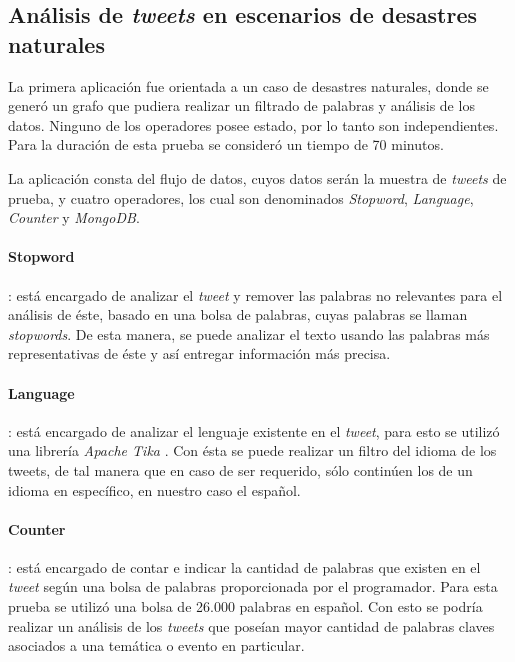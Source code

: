 
\subsection{Análisis de \textit{tweets} en escenarios de desastres naturales}
La primera aplicación fue orientada a un caso de desastres naturales, donde se generó un grafo que pudiera realizar un filtrado de palabras y análisis de los datos. Ninguno de los operadores posee estado, por lo tanto son independientes. Para la duración de esta prueba se consideró un tiempo de 70 minutos.

La aplicación consta del flujo de datos, cuyos datos serán la muestra de \textit{tweets} de prueba, y cuatro operadores, los cual son denominados \textit{Stopword}, \textit{Language}, \textit{Counter} y \textit{MongoDB}.

\paragraph{Stopword}: está encargado de analizar el \textit{tweet} y remover las palabras no relevantes para el análisis de éste, basado en una bolsa de palabras, cuyas palabras se llaman \textit{stopwords}. De esta manera, se puede analizar el texto usando las palabras más representativas de éste y así entregar información más precisa.

\paragraph{Language}: está encargado de analizar el lenguaje existente en el \textit{tweet}, para esto se utilizó una librería \textit{Apache Tika} \citep{mattmann2011tika}. Con ésta se puede realizar un filtro del idioma de los tweets, de tal manera que en caso de ser requerido, sólo continúen los de un idioma en específico, en nuestro caso el español.

\paragraph{Counter}: está encargado de contar e indicar la cantidad de palabras que existen en el \textit{tweet} según una bolsa de palabras proporcionada por el programador. Para esta prueba se utilizó una bolsa de 26.000 palabras en español. Con esto se podría realizar un análisis de los \textit{tweets} que poseían mayor cantidad de palabras claves asociados a una temática o evento en particular.

